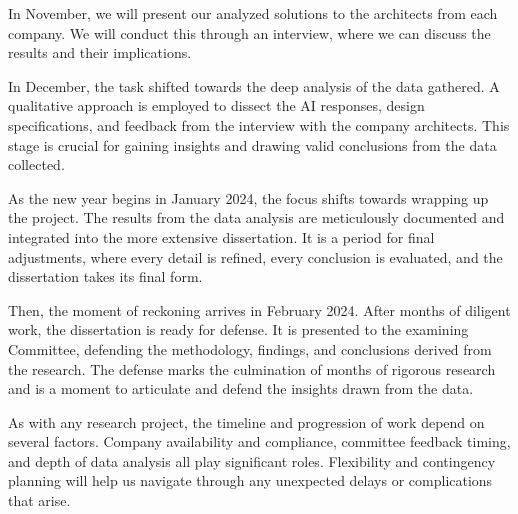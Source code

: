 In November, we will present our analyzed solutions to the architects from each company. We will conduct this through an interview, where we can discuss the results and their implications.

In December, the task shifted towards the deep analysis of the data gathered. A qualitative approach is employed to dissect the AI responses, design specifications, and feedback from the interview with the company architects. This stage is crucial for gaining insights and drawing valid conclusions from the data collected.

As the new year begins in January 2024, the focus shifts towards wrapping up the project. The results from the data analysis are meticulously documented and integrated into the more extensive dissertation. It is a period for final adjustments, where every detail is refined, every conclusion is evaluated, and the dissertation takes its final form.

Then, the moment of reckoning arrives in February 2024. After months of diligent work, the dissertation is ready for defense. It is presented to the examining Committee, defending the methodology, findings, and conclusions derived from the research. The defense marks the culmination of months of rigorous research and is a moment to articulate and defend the insights drawn from the data.

As with any research project, the timeline and progression of work depend on several factors. Company availability and compliance, committee feedback timing, and depth of data analysis all play significant roles. Flexibility and contingency planning will help us navigate through any unexpected delays or complications that arise.